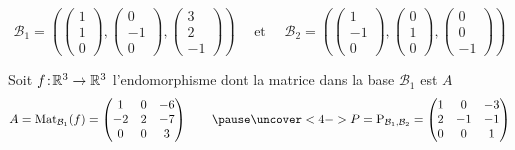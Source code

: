 \begin{frame}
\begin{exemple}
$$\mathcal{B}_1 = 
\left(
\left(\begin{smallmatrix} 1\\1\\0\end{smallmatrix}\right),
\left(\begin{smallmatrix} 0 \\ -1 \\ 0\end{smallmatrix}\right),
\left(\begin{smallmatrix} 3\\2\\-1\end{smallmatrix}\right)
\right)
\quad \text{ et } \quad
\mathcal{B}_2 = 
\left(
\left(\begin{smallmatrix} 1\\-1\\0\end{smallmatrix}\right),
\left(\begin{smallmatrix} 0 \\ 1 \\ 0\end{smallmatrix}\right),
\left(\begin{smallmatrix} 0\\0\\-1\end{smallmatrix}\right)
\right)
$$

\bigskip
\pause

Soit $f \!:\! \mathbb{R}^3 \to \mathbb{R}^3$ l'endomorphisme dont
la matrice dans la base $\mathcal{B}_1$ est $A$
$$A = \Mat_{\mathcal{B}_1}(f)
=\begin{pmatrix}
1 & 0 & -6\\
-2 & 2 & -7\\
0 & 0 & 3
\end{pmatrix}
\qquad
\pause
\uncover<4->{P = \Pass_{\mathcal{B}_1, \mathcal{B}_2} = 
\begin{pmatrix}
1 & 0 & -3\\
2 & -1 & -1\\
0 & 0 & 1
\end{pmatrix}}$$

\medskip



\end{exemple}
\end{frame}
